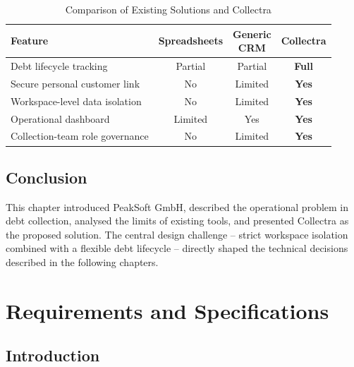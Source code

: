 \documentclass[12pt,a4paper]{report}
\newcommand{\reporttablesetup}{%
  \small%
  \setlength{\tabcolsep}{5pt}%
  \renewcommand{\arraystretch}{1.38}%
  \arrayrulecolor{framegray}%
}
\begin{document}
\begin{table}[H]
  \centering
  \reporttablesetup
  \begin{tabularx}{\textwidth}{|Y|C|C|C|}
    \hline
    \textbf{Feature} &
    \textbf{Spread\-sheets} &
    \textbf{Generic\footnotemark\\CRM} &
    \textbf{Collectra} \\
    \hline
    Debt lifecycle tracking          & Partial  & Partial & \textbf{Full} \\
    \hline
    Secure personal customer link    & No       & Limited & \textbf{Yes} \\
    \hline
    Workspace-level data isolation   & No       & Limited & \textbf{Yes} \\
    \hline
    Operational dashboard            & Limited  & Yes     & \textbf{Yes} \\
    \hline
    Collection-team role governance  & No       & Limited & \textbf{Yes} \\
    \hline
  \end{tabularx}
  \caption{Comparison of Existing Solutions and Collectra}
  \label{tab:comparison}
\end{table}

\section*{Conclusion}
{}

This chapter introduced PeakSoft GmbH, described the operational problem in debt
collection, analysed the limits of existing tools, and presented Collectra as the
proposed solution.
The central design challenge -- strict workspace isolation combined with a flexible
debt lifecycle -- directly shaped the technical decisions described in the following
chapters.

\clearpage
\chapter{Requirements and Specifications}

\section*{Introduction}
{}
\end{document}
